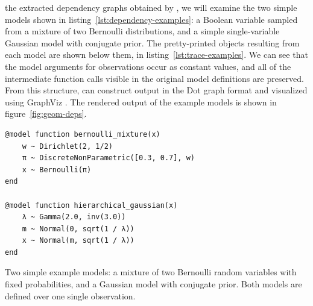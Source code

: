  the extracted dependency graphs obtained by \autogibbsjl{}, we will
examine the two simple models shown in listing~\ref{lst:dependency-examples}: a Boolean variable
sampled from a mixture of two Bernoulli distributions, and a simple single-variable Gaussian model
with conjugate prior. The pretty-printed  objects resulting
from each model are shown below them, in listing~\ref{lst:trace-examples}.  We can see that the
model arguments for observations occur as constant values, and all of the intermediate function
calls visible in the original model definitions are preserved.  From this structure, \autogibbsjl{}
can construct output in the Dot graph format and visualized using GraphViz
\parencite{gansner2000open}.  The rendered output of the example models is shown in
figure~\ref{fig:geom-deps}.

\begin{lstfloat}[p]
\begin{lstlisting}[style=lstfloat]
@model function bernoulli_mixture(x)
    w ~ Dirichlet(2, 1/2)
    π ~ DiscreteNonParametric([0.3, 0.7], w)
    x ~ Bernoulli(π)
end

@model function hierarchical_gaussian(x)
    λ ~ Gamma(2.0, inv(3.0))
    m ~ Normal(0, sqrt(1 / λ))
    x ~ Normal(m, sqrt(1 / λ))
end
\end{lstlisting}
  \caption{Two simple example models: a mixture of two Bernoulli random variables with fixed
    probabilities, and a Gaussian model with conjugate prior.  Both models are defined over one
    single observation.}
  \label{lst:dependency-examples}
\end{lstfloat}

